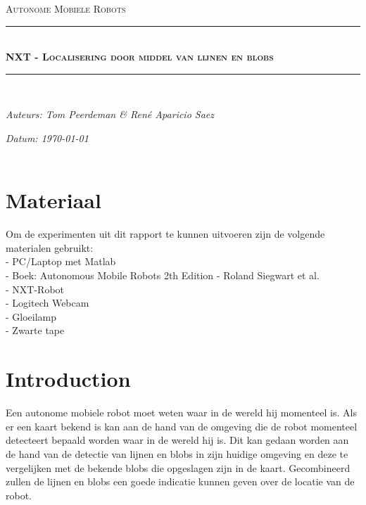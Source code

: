 \documentclass[a4paper]{article}
\newcommand{\HRule}{\rule{\linewidth}{0.5mm}}
\begin{document}
\begin{titlepage}
\begin{center}
\textsc{\Large Autonome Mobiele Robots}\\[0.5cm]
\HRule \\[0,4cm]
\textsc{\huge \bfseries NXT - Localisering door middel van lijnen en blobs}
\HRule \\[8cm]
\begin{minipage}{0.4\textwidth}
\begin{flushleft}\large
\emph{Auteurs: Tom Peerdeman \& Ren\'e Aparicio Saez}\\
\end{flushleft}
\end{minipage}
\begin{minipage}{0.4\textwidth}
\begin{flushright}\large
\emph{Datum: \today\\\hspace{1cm}}\\
\end{flushright}
\end{minipage}
\end{center}
\end{titlepage}

\tableofcontents
\newpage

\section{Materiaal}
Om de experimenten uit dit rapport te kunnen uitvoeren zijn de volgende materialen gebruikt:\\
- PC/Laptop met Matlab\\
- Boek: Autonomous Mobile Robots 2th Edition - Roland Siegwart et al.\\
- NXT-Robot\\
- Logitech Webcam\\
- Gloeilamp\\
- Zwarte tape

\section{Introduction}
Een autonome mobiele robot moet weten waar in de wereld hij momenteel is. Als er een kaart bekend is kan aan de hand van de omgeving die de robot momenteel detecteert bepaald worden waar in de wereld hij is. Dit kan gedaan worden aan de hand van de detectie van lijnen en blobs in zijn huidige omgeving en deze te vergelijken met de bekende blobs die opgeslagen zijn in de kaart. Gecombineerd zullen de lijnen en blobs een goede indicatie kunnen geven over de locatie van de robot.
\end{document}
